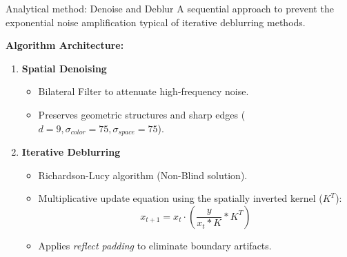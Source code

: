 \documentclass[10pt, handout]{beamer}
\begin{document}
\begin{frame}{Analytical method: Denoise and Deblur}
    \textbf{} A sequential approach to prevent the exponential noise amplification typical of iterative deblurring methods.

    \vspace{0.3cm}
    \textbf{Algorithm Architecture:}
    \begin{enumerate}
        \item \textbf{Spatial Denoising}
        \begin{itemize}
            \item Bilateral Filter to attenuate high-frequency noise.
            \item Preserves geometric structures and sharp edges ($d=9, \sigma_{color}=75, \sigma_{space}=75$).
        \end{itemize}
        
        \vspace{0.15cm}
        \item \textbf{Iterative Deblurring}
        \begin{itemize}
            \item Richardson-Lucy algorithm (Non-Blind solution).
            \item Multiplicative update equation using the spatially inverted kernel ($K^T$):
            \begin{equation*}
                x_{t+1} = x_t \cdot \left( \frac{y}{x_t * K} * K^T \right)
            \end{equation*}
            \item Applies \textit{reflect padding} to eliminate boundary artifacts.
        \end{itemize}
    \end{enumerate}

\end{frame}
\end{document}
